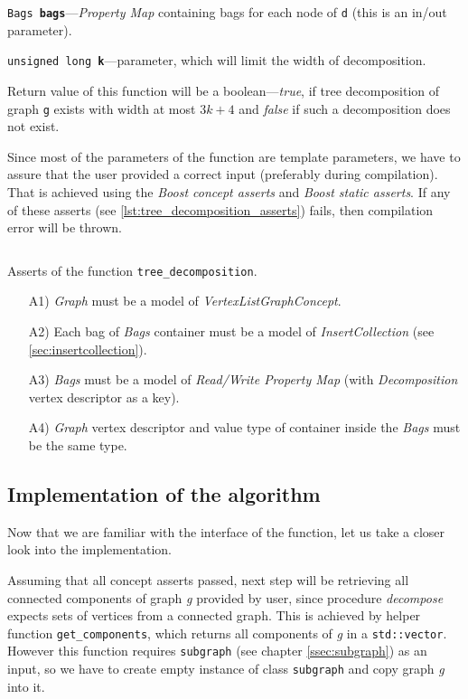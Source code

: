 \documentclass[thesis=B,english]{FITthesis}[2019/03/21]
\begin{document}
\noindent\texttt{Bags \textbf{bags}}---\emph{Property Map} containing bags for each node of \texttt{d} (this is an in/out parameter).

\noindent\texttt{unsigned long \textbf{k}}---parameter, which will limit the width of decomposition.

Return value of this function will be a boolean---\emph{true}, if tree decomposition of graph \texttt{g} exists with width at most $3k+4$ and \emph{false} if such a decomposition does not exist.

Since most of the parameters of the function are template parameters, we have to assure that the user provided a correct input (preferably during compilation). That is achieved using the \emph{Boost concept asserts} and \emph{Boost static asserts}. If any of these asserts (see \autoref{lst:tree_decomposition_asserts}) fails, then compilation error will be thrown.

\begin{listing}[H]
	\inputminted[tabsize=2,breaklines,bgcolor=codebg]{c++}{snippets/tree_decomposition_asserts.m}
	\caption[Asserts of the function \texttt{tree\_decomposition}]{Asserts of the function \texttt{tree\_decomposition}.}
	\label{lst:tree_decomposition_asserts}
\end{listing}

\begin{itemize}
	\item [A1)] \emph{Graph} must be a model of \emph{VertexListGraphConcept}.
	\item [A2)] Each bag of \emph{Bags} container must be a model of \emph{InsertCollection} (see \autoref{sec:insertcollection}).
	\item [A3)] \emph{Bags} must be a model of \emph{Read/Write Property Map} (with \emph{Decomposition} vertex descriptor as a key).
	\item [A4)] \emph{Graph} vertex descriptor and value type of container inside the \emph{Bags} must be the same type.
\end{itemize}

\subsection{Implementation of the algorithm}
Now that we are familiar with the interface of the function, let us take a closer look into the implementation. 

Assuming that all concept asserts passed, next step will be retrieving all connected components of graph \emph{g} provided by user, since procedure \emph{decompose} expects sets of vertices from a connected graph. This is achieved by helper function \texttt{get\_components}, which returns all components of \emph{g} in a \texttt{std::vector}. However this function requires \texttt{subgraph} (see chapter \autoref{ssec:subgraph}) as an input, so we have to create empty instance of class \texttt{subgraph} and copy graph \emph{g} into it.
\end{document}
